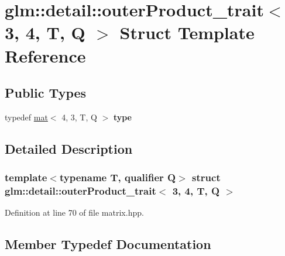 \hypertarget{structglm_1_1detail_1_1outerProduct__trait_3_013_00_014_00_01T_00_01Q_01_4}{}\section{glm\+:\+:detail\+:\+:outer\+Product\+\_\+trait$<$ 3, 4, T, Q $>$ Struct Template Reference}
\label{structglm_1_1detail_1_1outerProduct__trait_3_013_00_014_00_01T_00_01Q_01_4}
\subsection*{Public Types}
\begin{DoxyCompactItemize}
\item 
\mbox{\label{structglm_1_1detail_1_1outerProduct__trait_3_013_00_014_00_01T_00_01Q_01_4_a49854a641e22e4e4e6dce870f1baec2c}} 
typedef \hyperlink{structglm_1_1mat}{mat}$<$ 4, 3, T, Q $>$ {\bfseries type}
\end{DoxyCompactItemize}


\subsection{Detailed Description}
\subsubsection*{template$<$typename T, qualifier Q$>$\newline
struct glm\+::detail\+::outer\+Product\+\_\+trait$<$ 3, 4, T, Q $>$}



Definition at line 70 of file matrix.\+hpp.



\subsection{Member Typedef Documentation}
\mbox{\label{structglm_1_1detail_1_1outerProduct__trait_3_013_00_014_00_01T_00_01Q_01_4_a49854a641e22e4e4e6dce870f1baec2c}} 
